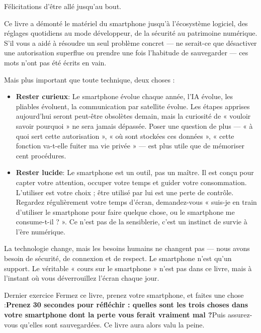 
Félicitations d'être allé jusqu'au bout.

Ce livre a démonté le matériel du smartphone jusqu'à l'écosystème logiciel, des réglages quotidiens au mode développeur, de la sécurité au patrimoine numérique. S'il vous a aidé à résoudre un seul problème concret — ne serait-ce que désactiver une autorisation superflue ou prendre une fois l'habitude de sauvegarder — ces mots n'ont pas été écrits en vain.

Mais plus important que toute technique, deux choses :

\begin{itemize}
  \item \textbf{Rester curieux}: Le smartphone évolue chaque année, l'IA évolue, les pliables évoluent, la communication par satellite évolue. Les étapes apprises aujourd'hui seront peut-être obsolètes demain, mais la curiosité de « vouloir savoir pourquoi » ne sera jamais dépassée. Poser une question de plus — « à quoi sert cette autorisation », « où sont stockées ces données », « cette fonction va-t-elle fuiter ma vie privée » — est plus utile que de mémoriser cent procédures.
  \item \textbf{Rester lucide}: Le smartphone est un outil, pas un maître. Il est conçu pour capter votre attention, occuper votre temps et guider votre consommation. L'utiliser est votre choix ; être utilisé par lui est une perte de contrôle. Regardez régulièrement votre temps d'écran, demandez-vous « suis-je en train d'utiliser le smartphone pour faire quelque chose, ou le smartphone me consume-t-il ? ». Ce n'est pas de la sensiblerie, c'est un instinct de survie à l'ère numérique.
\end{itemize}

La technologie change, mais les besoins humains ne changent pas — nous avons besoin de sécurité, de connexion et de respect. Le smartphone n'est qu'un support. Le véritable « cours sur le smartphone » n'est pas dans ce livre, mais à l'instant où vous déverrouillez l'écran chaque jour.

\begin{tcbpractice}{Dernier exercice}
Fermez ce livre, prenez votre smartphone, et faites une chose :\textbf{Prenez 30 secondes pour réfléchir : quelles sont les trois choses dans votre smartphone dont la perte vous ferait vraiment mal ?}Puis assurez-vous qu'elles sont sauvegardées. Ce livre aura alors valu la peine.

\end{tcbpractice}
